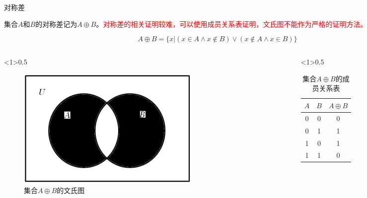 \documentclass[xetex,10pt,aspectratio=43]{beamer}
\begin{document}
	\begin{frame}{对称差}
	
	集合$A$和$B$的对称差记为$A\oplus B$。\textcolor{red}{对称差的相关证明较难，可以使用成员关系表证明，文氏图不能作为严格的证明方法。}
	
	$$A\oplus B=\{x|(x\in A\wedge x\notin B)\vee(x\notin A\wedge x\in B)\}$$
	
	\begin{columns}
		
	\begin{column}{0.5\textwidth}
			
	\begin{figure}
				
	\centering
	
	\includegraphics[scale=0.4]{4.png}
	
	\caption{集合$A\oplus B$的文氏图}
		
	\end{figure}
			
	\end{column}
		
	\begin{column}{0.5\textwidth}
		
	\begin{table}
		
	\centering
	
	\begin{tabular}{|c|c|c|}
		\hline
		$A$ & $B$ & $A\oplus B$\\
		\hline
		0 & 0 & 0\\
		\hline
		0 & 1 & 1\\
		\hline
		1 & 0 & 1\\
		\hline
		1 & 1 & 0\\
		\hline
	\end{tabular}
	
	\caption{集合$A\oplus B$的成员关系表}
		
	\end{table}
		
	\end{column}
		
	\end{columns}
	
	\end{frame}
\end{document}

